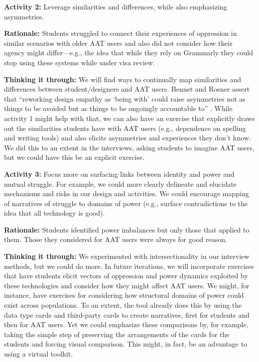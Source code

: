 \documentclass[11pt,dvipdfm]{article}
\begin{document}
\textbf{Activity 2:} Leverage similarities and differences, while also emphasizing asymmetries.

\textbf{Rationale:}
Students struggled to connect their experiences of oppression in similar scenarios with older AAT users and also did not consider how their agency might differ---e.g., the idea that while they rely on Grammarly they could stop using these systems while under visa review.

\textbf{Thinking it through:}
We will find ways to continually map similarities and differences between student/designers and AAT users.  Bennet and Rosner assert that “reworking design empathy as ‘being with’ could raise asymmetries not as things to be avoided but as things to be ongoingly accountable to” \cite{5}. While activity 1 might help with that, we can also have an exercise that explicitly draws out the similarities students have with AAT users (e.g., dependence on spelling and writing tools) and also elicits asymmetries and experiences they don’t know. We did this to an extent in the interviews, asking students to imagine AAT users, but we could have this be an explicit exercise.

\textbf{Activity 3:} Focus more on surfacing links between identity and power and mutual struggle. For example, we could more clearly delineate and elucidate mechanisms and risks in our design and activities. We could encourage mapping of narratives of struggle to domains of power (e.g., surface contradictions to the idea that all technology is good).

\textbf{Rationale:}
Students identified power imbalances but only those that applied to them. Those they considered for AAT users were always for good reason.

\textbf{Thinking it through:}
We experimented with intersectionality in our interview methods, but we could do more. In future iterations, we will incorporate exercises that have students elicit vectors of oppression and power dynamics exploited by these technologies and consider how they might affect AAT users. We might, for instance, have exercises for considering how structural domains of power could exist across populations. To an extent, the tool already does this by using the data type cards and third-party cards to create narratives, first for students and then for AAT users. Yet we could emphasize these comparisons by, for example, taking the simple step of preserving the arrangements of the cards for the students and forcing visual comparison. This might, in fact, be an advantage to using a virtual toolkit.
\end{document}
